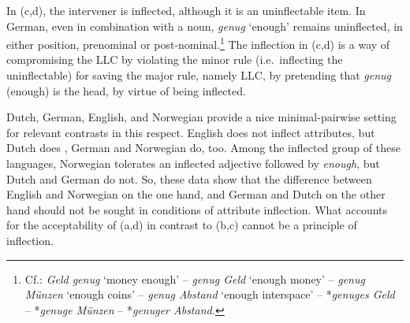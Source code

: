\documentclass[output=paper
  ,nobabel
  ,uniformtopskip %
]{langscibook}
\begin{document}
\label{ex-beine}

\label{ex-groß}

\label{ex-fest}
\zl

\noindent
In (c,d), the intervener is inflected, although it is an uninflectable item. In German, even in combination with a noun, \emph{genug} `enough' remains uninflected, in either position, prenominal or post-nominal.\footnote{Cf.: \emph{Geld genug} `money enough' – \emph{genug Geld} `enough money' – \emph{genug Münzen}  `enough coins' – \emph{genug Abstand} `enough interspace' – *\emph{genuges Geld} – *\emph{genuge Münzen} – *\emph{genuger Abstand.}} The inflection in (c,d) is a way of compromising the LLC by violating the minor rule (i.e.\ inflecting the uninflectable) for saving the major rule, namely LLC, by pretending that \emph{genug} (enough) is the head, by virtue of being inflected.

Dutch, German, English, and Norwegian provide a nice minimal-pairwise setting for relevant contrasts in this respect. English does not inflect attributes, but Dutch does \citep[454]{Broekhuis2013}, German and Norwegian \citep[180]{Fabricius-Hansen2010} do, too. Among the inflected group of these languages, Norwegian tolerates an inflected adjective followed by \emph{enough}, but Dutch and German do not. So, these data show that the difference between English and Norwegian on the one hand, and German and Dutch on the other hand should not be sought in conditions of attribute inflection. What accounts for the acceptability of (a,d) in contrast to (b,c) cannot be a principle of inflection.
\end{document}

